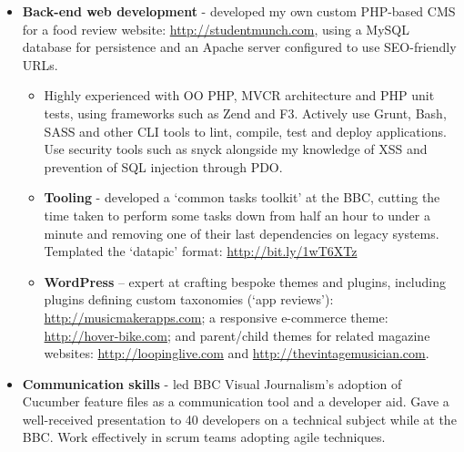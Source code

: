 \documentclass[class=article, crop=false]{standalone}
\begin{document}
\begin{itemize}
\begin{itemize}
    \end{itemize}

    \item \textbf{Back-end web development} - developed my own custom PHP-based CMS for a food review website: \url{http://studentmunch.com}, using a MySQL database for persistence and an Apache server configured to use SEO-friendly URLs.

    \begin{itemize}
        \setlength\itemsep{0.3em}

        \item Highly experienced with OO PHP, MVCR architecture and PHP unit tests, using frameworks such as Zend and F3. Actively use Grunt, Bash, SASS and other CLI tools to lint, compile, test and deploy applications. Use security tools such as snyck alongside my knowledge of XSS and prevention of SQL injection through PDO.

        \item \textbf{Tooling} - developed a ‘common tasks toolkit’ at the BBC, cutting the time taken to perform some tasks down from half an hour to under a minute and removing one of their last dependencies on legacy systems. Templated the ‘datapic’ format: \url{http://bit.ly/1wT6XTz}

        \item \textbf{WordPress} – expert at crafting bespoke themes and plugins, including plugins defining custom taxonomies (`app reviews'): \url{http://musicmakerapps.com}; a responsive e-commerce theme: \url{http://hover-bike.com}; and parent/child themes for related magazine websites: \url{http://loopinglive.com} and
        \url{http://thevintagemusician.com}.

    \end{itemize}

    \item \textbf{Communication skills} - led BBC Visual Journalism's adoption of Cucumber feature files as a communication tool and a developer aid. Gave a well-received presentation to 40 developers on a technical subject while at the BBC. Work effectively in scrum teams adopting agile techniques.

\end{itemize}
\end{document}
